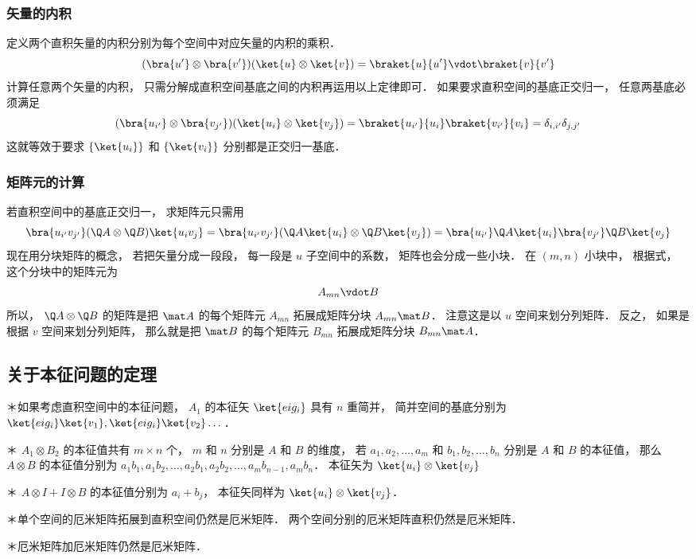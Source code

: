 \subsubsection{矢量的内积}

定义两个直积矢量的内积分别为每个空间中对应矢量的内积的乘积．
\begin{equation}
(\bra{u'}\otimes\bra{v'})(\ket{u}\otimes\ket{v}) = \braket{u}{u'}\vdot \braket{v}{v'}
\end{equation}
计算任意两个矢量的内积， 只需分解成直积空间基底之间的内积再运用以上定律即可． 如果要求直积空间的基底正交归一， 任意两基底必须满足
\begin{equation}
(\bra{u_{i'}} \otimes \bra{v_{j'}})(\ket{u_i} \otimes \ket{v_j}) = \braket{u_{i'}}{u_i} \braket{v_{i'}}{v_i} = \delta_{i,i'}\delta_{j,j'}
\end{equation}
这就等效于要求 $\{\ket{u_i}\}$ 和 $\{\ket{v_i}\}$  分别都是正交归一基底．

\subsubsection{矩阵元的计算}
若直积空间中的基底正交归一， 求矩阵元只需用
\begin{equation}
\bra{u_{i'} v_{j'}} (\Q A \otimes \Q B) \ket{u_i v_j} = \bra{u_{i'} v_{j'}} (\Q A \ket{u_i} \otimes \Q B \ket{v_j}) = \bra{u_{i'}} \Q A \ket{u_i} \bra{v_{j'}} \Q B \ket{v_j}
\end{equation}
现在用分块矩阵的概念， 若把矢量分成一段段， 每一段是 $u$ 子空间中的系数， 矩阵也会分成一些小块． 在 $(m, n)$ 小块中， 根据式， 这个分块中的矩阵元为
\begin{equation}
A_{mn} \vdot B
\end{equation}
所以， $\Q A \otimes \Q B$ 的矩阵是把 $\mat A$ 的每个矩阵元 $A_{mn}$ 拓展成矩阵分块 $A_{mn} \mat B$．  注意这是以 $u$ 空间来划分列矩阵． 反之， 如果是根据 $v$ 空间来划分列矩阵， 那么就是把 $\mat B$ 的每个矩阵元 $B_{mn}$ 拓展成矩阵分块 $B_{mn} \mat A$． 

\subsection{关于本征问题的定理}%
	
＊如果考虑直积空间中的本征问题， $A_1$  的本征矢 $\ket{eig_i}$ 具有 $n$ 重简并， 简并空间的基底分别为 $\ket{eig_i}\ket{v_1}, \ket{eig_i}\ket{v_2}\dots$． 

＊ $A_1 \otimes B_2$ 的本征值共有 $m \times n$ 个， $m$ 和 $n$ 分别是 $A$ 和 $B$ 的维度， 若 $a_1, a_2,\dots, a_m$ 和 $b_1, b_2, \dots, b_n$ 分别是 $A$ 和 $B$ 的本征值， 那么 $A \otimes B$ 的本征值分别为 $a_1 b_1, a_1 b_2, \dots, a_2 b_1, a_2 b_2, \dots, a_m b_{n-1}, a_m b_n$．  本征矢为 $\ket{u_i} \otimes \ket{v_j}$ 

＊ $A \otimes I + I \otimes B$ 的本征值分别为 $a_i + b_j$，  本征矢同样为 $\ket{u_i} \otimes \ket{v_j}$． 

＊单个空间的厄米矩阵拓展到直积空间仍然是厄米矩阵． 两个空间分别的厄米矩阵直积仍然是厄米矩阵． 

＊厄米矩阵加厄米矩阵仍然是厄米矩阵．

